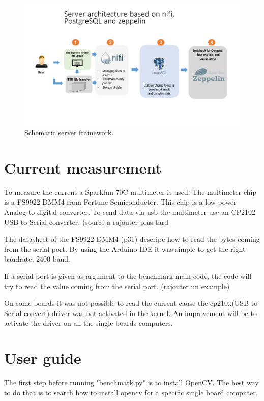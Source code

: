 \documentclass[english]{book_template} %
\begin{document}
\begin{figure}[H]
\center
\caption{Schematic server framework.\label{fig:server Arch}}
\includegraphics[scale=0.55]{./img/serverArch.jpg}
\end{figure} 

\section{Current measurement}

To measure the current a Sparkfun 70C multimeter is used. The multimeter chip is a FS9922-DMM4 from Fortune Semiconductor. This chip is a low power Analog to digital converter.   To send data via usb the multimeter use an CP2102 USB to Serial converter. (source a rajouter plus tard %

The datasheet of the FS9922-DMM4 (p31) descripe how to read the bytes coming from the serial port. By using the Arduino IDE it was simple to get the right baudrate, 2400 baud. 

If a serial port is given as argument to the benchmark main code, the code will try to read the value coming from the serial port. (rajouter un example) 

On some boards it was not possible to read the current cause the cp210x(USB to Serial convert) driver was not activated in the kernel. An improvement will be to activate the driver on all the single boards computers.
\section{User guide}


The first step before running "benchmark.py" is to install OpenCV. The best way to do that is to search how to install opencv for a specific single board computer.
\end{document}
